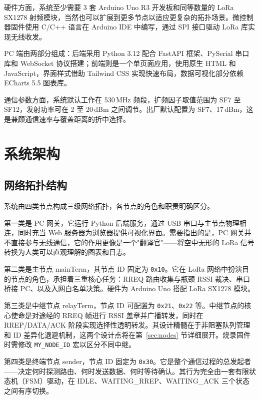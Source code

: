 \documentclass[12pt,a4paper]{ctexart}
\begin{document}
硬件方面，系统至少需要 3 套 Arduino Uno R3 开发板和同等数量的 LoRa SX1278 射频模块，当然也可以扩展到更多节点以适应更复杂的拓扑场景。微控制器固件使用 C/C++ 语言在 Arduino IDE 中编写，通过 SPI 接口驱动 LoRa 库实现无线收发。

PC 端由两部分组成：后端采用 Python 3.12 配合 FastAPI 框架、PySerial 串口库和 WebSocket 协议搭建；前端则是一个单页面应用，使用原生 HTML 和 JavaScript，界面样式借助 Tailwind CSS 实现快速布局，数据可视化部分依赖 ECharts 5.5 图表库。

通信参数方面，系统默认工作在 530\,MHz 频段，扩频因子取值范围为 SF7 至 SF12，发射功率可在 2 至 20\,dBm 之间调节。出厂默认配置为 SF7、17\,dBm，这是兼顾通信速率与覆盖距离的折中选择。

\section{系统架构}
\label{sec:arch}

\subsection{网络拓扑结构}

系统由四类节点构成三级网络拓扑，各节点的角色和职责明确区分。

第一类是 PC 网关，它运行 Python 后端服务，通过 USB 串口与主节点物理相连，同时充当 Web 服务器为浏览器提供可视化界面。需要指出的是，PC 网关并不直接参与无线通信，它的作用更像是一个"翻译官"——将空中无形的 LoRa 信号转换为人类可以直观理解的图表和日志。

第二类是主节点 mainTerm，其节点 ID 固定为 \texttt{0x10}。它在 LoRa 网络中扮演目的节点的角色，承担着三重核心任务：RREQ 路由收集与瓶颈 RSSI 裁决、串口桥接 PC、以及入网白名单决策。硬件为 Arduino Uno 搭配 LoRa SX1278 模块。

第三类是中继节点 relayTerm，节点 ID 可配置为 \texttt{0x21}、\texttt{0x22} 等。中继节点的核心使命是对途经的 RREQ 帧进行 RSSI 盖章并广播转发，同时在 RREP/DATA/ACK 阶段实现选择性透明转发。其设计精髓在于非阻塞队列管理和 ID 差异化退避机制，这两个设计点将在第~\ref{sec:nodes} 节详细展开。烧录固件时需修改 \texttt{MY\_NODE\_ID} 宏以区分不同中继。

第四类是终端节点 sender，节点 ID 固定为 \texttt{0x30}。它是整个通信过程的总发起者——决定何时探测路由、何时发送数据、何时等待确认。其行为完全由一套有限状态机（FSM）驱动，在 IDLE、WAITING\_RREP、WAITING\_ACK 三个状态之间有序切换。
\end{document}
